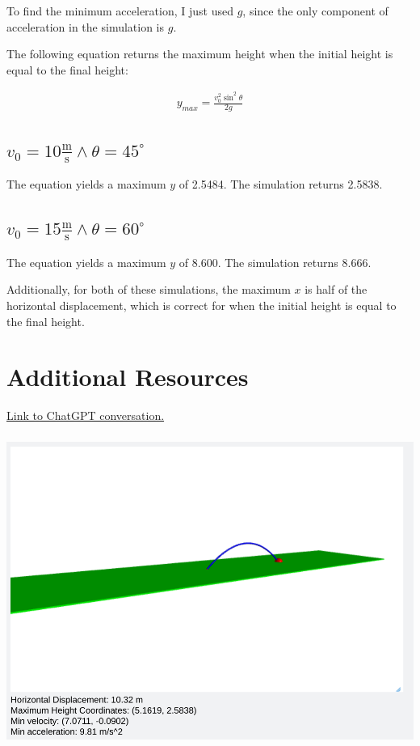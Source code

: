 \documentclass[12pt]{article}
\begin{document}
To find the minimum acceleration, I just used \(g\), since the only component of acceleration in the simulation is \(g\).

The following equation returns the maximum height when the initial height is equal to the final height:

\begin{align}
y_{max} = \frac{ v_0^2 \sin^2\theta }{ 2g }
\end{align}
\subsection{\(v_0 = 10 \frac{\text{m}}{\text{s}} \land \theta = 45 ^{\circ}\)}
\label{sec:org37b5ea0}

The equation yields a maximum \(y\) of 2.5484. The simulation returns 2.5838.
\subsection{\(v_0 = 15 \frac{\text{m}}{\text{s}} \land \theta = 60 ^{\circ}\)}
\label{sec:org1aa0786}

The equation yields a maximum \(y\) of 8.600. The simulation returns 8.666.

Additionally, for both of these simulations, the maximum \(x\) is half of the horizontal displacement, which is correct for when the initial height is equal to the final height.
\section{Additional Resources}
\label{sec:orgf5b823b}

\href{https://chatgpt.com/share/66e79c20-298c-8004-8420-2adccbdf437f}{Link to ChatGPT conversation.}

\begin{center}
\includegraphics[height=4in]{./10ms.png}
\end{center}
\end{document}

